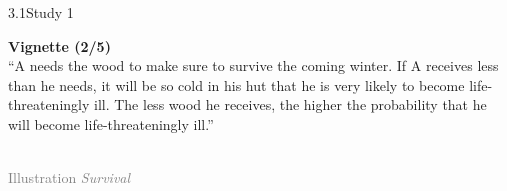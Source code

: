 \documentclass[xcolor=table,9pt,aspectratio=169]{beamer}
\begin{document}
\begin{frame}{\vspace*{10mm}3.1\hspace*{1em}Study 1}
\begin{multicols}{2}
   \textbf{Vignette (2/5)}\\
   \medskip
   \enquote{A needs the wood to make sure to survive the coming winter.
   If A receives less than he needs, it will be so cold in his hut that he is very likely to become life-threateningly ill.
   The less wood he receives, the higher the probability that he will become life-threateningly ill.}
   \vfill
   \begin{center}
      \\
      \textcolor{gray}{Illustration \textit{Survival}}
   \end{center}
\end{multicols}
\end{frame}
\end{document}
